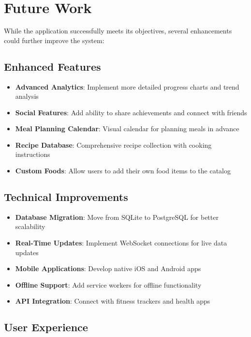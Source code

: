 \section{Future Work}

While the application successfully meets its objectives, several enhancements could further improve the system:

\subsection{Enhanced Features}

\begin{itemize}
    \item \textbf{Advanced Analytics}: Implement more detailed progress charts and trend analysis
    \item \textbf{Social Features}: Add ability to share achievements and connect with friends
    \item \textbf{Meal Planning Calendar}: Visual calendar for planning meals in advance
    \item \textbf{Recipe Database}: Comprehensive recipe collection with cooking instructions
    \item \textbf{Custom Foods}: Allow users to add their own food items to the catalog
\end{itemize}

\subsection{Technical Improvements}

\begin{itemize}
    \item \textbf{Database Migration}: Move from SQLite to PostgreSQL for better scalability
    \item \textbf{Real-Time Updates}: Implement WebSocket connections for live data updates
    \item \textbf{Mobile Applications}: Develop native iOS and Android apps
    \item \textbf{Offline Support}: Add service workers for offline functionality
    \item \textbf{API Integration}: Connect with fitness trackers and health apps
\end{itemize}

\subsection{User Experience}

